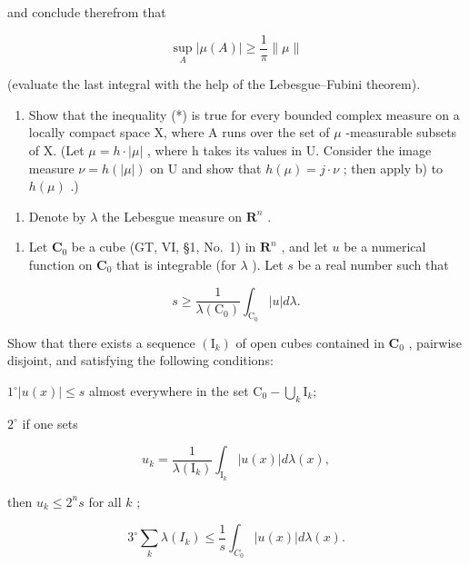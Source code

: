 and conclude therefrom that

\[
\sup _ {A} | \mu (A) | \geqslant \frac {1}{\pi} \| \mu \|\tag{*}
\]

(evaluate the last integral with the help of the Lebesgue--Fubini theorem).

\begin{enumerate}
\def\labelenumi{\alph{enumi})}
\setcounter{enumi}{2}
\tightlist
\item
  Show that the inequality (*) is true for every bounded complex measure on a locally compact space X, where A runs over the set of \(\mu\) -measurable subsets of X. (Let \(\mu = h \cdot |\mu|\) , where h takes its values in U. Consider the image measure \(\nu = h(|\mu|)\) on U and show that \(h(\mu) = j \cdot \nu\) ; then apply b) to \(h(\mu)\) .)
\end{enumerate}

\begin{enumerate}
\def\labelenumi{\arabic{enumi})}
\setcounter{enumi}{20}
\tightlist
\item
  Denote by \(\lambda\) the Lebesgue measure on \(\mathbf{R}^n\) .
\end{enumerate}

\begin{enumerate}
\def\labelenumi{\alph{enumi})}
\tightlist
\item
  Let \(\mathbf{C}_0\) be a cube (GT, VI, §1, No.~1) in \(\mathbf{R}^n\) , and let \(u\) be a numerical function on \(\mathbf{C}_0\) that is integrable (for \(\lambda\) ). Let \(s\) be a real number such that
\end{enumerate}

\[
s \geqslant \frac {1}{\lambda (\mathrm{C} _ {0})} \int_ {\mathrm{C} _ {0}} | u | d \lambda .
\]

Show that there exists a sequence \((\mathrm{I}_k)\) of open cubes contained in \(\mathbf{C}_0\) , pairwise disjoint, and satisfying the following conditions:

\(1^{\circ}\left|u(x)\right|\leqslant s\) almost everywhere in the set \(\mathrm{C_0 - }\bigcup_{k}\mathrm{I}_k;\)

\(2^{\circ}\) if one sets

\[
u _ {k} = \frac {1}{\lambda (\mathrm{I} _ {k})} \int_ {\mathrm{I} _ {k}} | u (x) | d \lambda (x),
\]

then \(u_{k} \leqslant 2^{n}s\) for all \(k\) ;

\[
3 ^ {\circ} \sum_ {k} \lambda (I _ {k}) \leqslant \frac {1}{s} \int_ {C _ {0}} | u (x) | d \lambda (x).
\]

